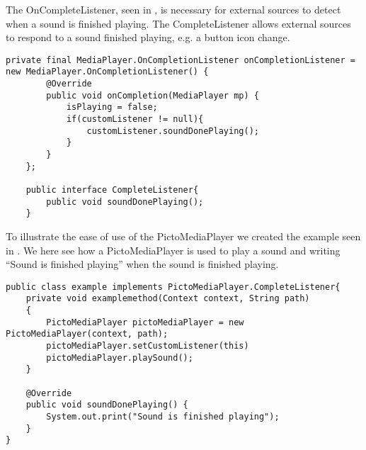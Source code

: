 The OnCompleteListener, seen in , is necessary for external sources to detect when a sound is finished playing. The CompleteListener allows external sources to respond to a sound finished playing, e.g. a button icon change.

\begin{lstlisting}[label=lst:completelistener, caption = {onCompleteListener method of PictoMediaPlayer}]
private final MediaPlayer.OnCompletionListener onCompletionListener = new MediaPlayer.OnCompletionListener() {
        @Override
        public void onCompletion(MediaPlayer mp) {
            isPlaying = false;
            if(customListener != null){
                customListener.soundDonePlaying();
            }
        }
    };

    public interface CompleteListener{
        public void soundDonePlaying();
    }
\end{lstlisting}

To illustrate the ease of use of the PictoMediaPlayer we created the example seen in . 
We here see how a PictoMediaPlayer is used to play a sound and writing ``Sound is finished playing'' when the sound is finished playing.

\begin{lstlisting}[label=lst:mediaplayerexample, caption={Example of PictoMediaPlayer}]
public class example implements PictoMediaPlayer.CompleteListener{
    private void examplemethod(Context context, String path)
    {
        PictoMediaPlayer pictoMediaPlayer = new PictoMediaPlayer(context, path);
        pictoMediaPlayer.setCustomListener(this)
        pictoMediaPlayer.playSound();
    }

    @Override
    public void soundDonePlaying() {
        System.out.print("Sound is finished playing");
    }
}
\end{lstlisting}





